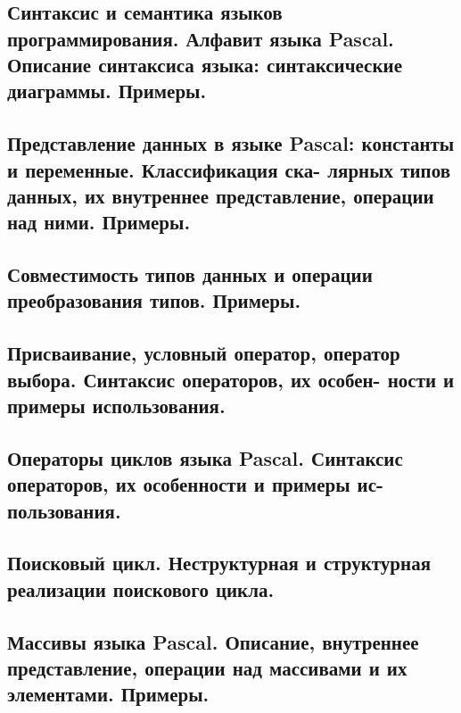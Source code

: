 \documentclass[a4paper, 10pt]{article}
\begin{document}
\section{}

\subsection{Синтаксис  и  семантика  языков  программирования.  Алфавит  языка  Pascal.  Описание 
синтаксиса языка: синтаксические диаграммы. Примеры. }



\subsection{Представление  данных  в  языке  Pascal:  константы  и  переменные.  Классификация  ска-
лярных типов данных, их внутреннее представление, операции над ними. Примеры.} 



\subsection{Совместимость типов данных и операции преобразования типов. Примеры. }



\subsection{Присваивание, условный оператор, оператор выбора. Синтаксис операторов, их особен-
ности и примеры использования. }



\subsection{Операторы циклов языка Pascal. Синтаксис операторов, их особенности и примеры ис-
пользования. }



\subsection{Поисковый цикл. Неструктурная и структурная реализации поискового цикла. }



\subsection{Массивы языка Pascal. Описание, внутреннее представление, операции над массивами и 
их элементами. Примеры. }
\end{document}
